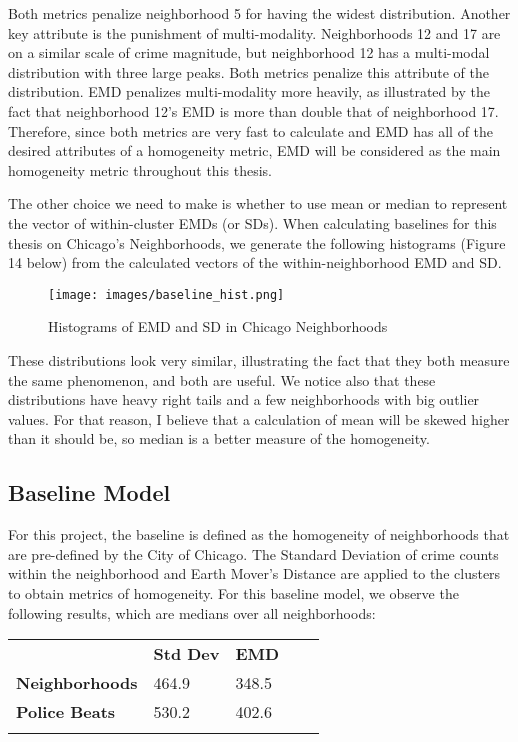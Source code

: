\documentclass[times new roman,12pt]{article}
\begin{document}
Both metrics penalize neighborhood 5 for having the widest distribution. Another key attribute is the punishment of multi-modality. Neighborhoods 12 and 17 are on a similar scale of crime magnitude, but neighborhood 12 has a multi-modal distribution with three large peaks. Both metrics penalize this attribute of the distribution. EMD penalizes multi-modality more heavily, as illustrated by the fact that neighborhood 12's EMD is more than double that of neighborhood 17. Therefore, since both metrics are very fast to calculate and EMD has all of the desired attributes of a homogeneity metric, EMD will be considered as the main homogeneity metric throughout this thesis. 

The other choice we need to make is whether to use mean or median to represent the vector of within-cluster EMDs (or SDs). When calculating baselines for this thesis on Chicago's Neighborhoods, we generate the following histograms (Figure 14 below) from the calculated vectors of the within-neighborhood EMD and SD. 

\begin{figure}[H]
\label{fig9}
\centering
  \texttt{[image: images/baseline\_hist.png]}
  \caption{Histograms of EMD and SD in Chicago Neighborhoods}
  \label{fig:baseline_hist}
\end{figure}

These distributions look very similar, illustrating the fact that they both measure the same phenomenon, and both are useful. We notice also that these distributions have heavy right tails and a few neighborhoods with big outlier values. For that reason, I believe that a calculation of mean will be skewed higher than it should be, so median is a better measure of the homogeneity. 

\subsection{Baseline Model}

For this project, the baseline is defined as the homogeneity of neighborhoods that are pre-defined by the City of Chicago. The Standard Deviation of crime counts within the neighborhood and Earth Mover's Distance are applied to the clusters to obtain metrics of homogeneity. For this baseline model, we observe the following results, which are medians over all neighborhoods: 

\begin{table}[h]
\centering
\begin{tabular}{lllll}
\cline{2-3}
\multicolumn{1}{l|}{}               & \multicolumn{1}{l|}{\textbf{Std Dev}} & \multicolumn{1}{l|}{\textbf{EMD}}   &  &  \\ \cline{1-3}
\multicolumn{1}{|l|}{\textbf{Neighborhoods}} & \multicolumn{1}{l|}{464.9}   & \multicolumn{1}{l|}{348.5} &  &  \\ \cline{1-3}
\multicolumn{1}{|l|}{\textbf{Police Beats}}  & \multicolumn{1}{l|}{530.2}   & \multicolumn{1}{l|}{402.6} &  &  \\ \cline{1-3}
                                    &                              &                            &  & 
\end{tabular}
\end{table}
\end{document}
